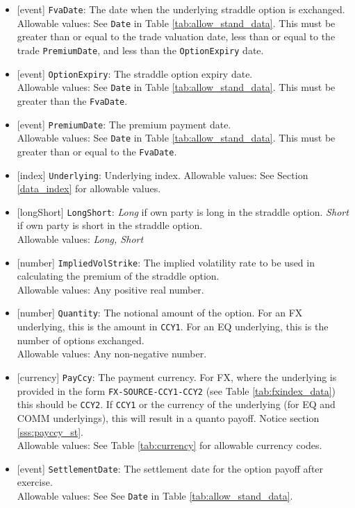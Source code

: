 \begin{itemize} 
  \item{}[event] \lstinline!FvaDate!: The date when the underlying straddle option is exchanged. \\
    Allowable values: See \lstinline!Date! in Table \ref{tab:allow_stand_data}.
    This must be greater than or equal to the trade valuation date, less than or equal
    to the trade \lstinline!PremiumDate!, and less than the \lstinline!OptionExpiry!
    date.
  \item{}[event] \lstinline!OptionExpiry!: The straddle option expiry date. \\
    Allowable values: See \lstinline!Date! in Table \ref{tab:allow_stand_data}.
    This must be greater than the \lstinline!FvaDate!.
  \item{}[event] \lstinline!PremiumDate!: The premium payment date. \\
    Allowable values: See \lstinline!Date! in Table \ref{tab:allow_stand_data}.
    This must be greater than or equal to the \lstinline!FvaDate!.
  \item{}[index] \lstinline!Underlying!: Underlying index.
    Allowable values: See Section \ref{data_index} for allowable values.
  \item{}[longShort] \lstinline!LongShort!: \emph{Long} if own party is long in the straddle option. \emph{Short} if own party is short in the straddle option.\\ 
    Allowable values: \emph{Long, Short} 
  \item{}[number] \lstinline!ImpliedVolStrike!: The implied volatility rate to be used in calculating the premium of the straddle option.\\
    Allowable values: Any positive real number.
  \item{}[number] \lstinline!Quantity!: The notional amount of the option. For an FX underlying, this is the amount in \lstinline!CCY1!.
  For an EQ underlying, this is the number of options exchanged.\\
    Allowable values: Any non-negative number.
  \item{}[currency] \lstinline!PayCcy!: The payment currency. For FX, where the underlying is provided
      in the form \lstinline!FX-SOURCE-CCY1-CCY2! (see Table \ref{tab:fxindex_data}) this should
      be \lstinline!CCY2!. If \lstinline!CCY1! or the currency of the underlying (for EQ and
      COMM underlyings), this will result in a quanto payoff. Notice section \ref{sss:payccy_st}. \\
        Allowable values: See Table \ref{tab:currency} for allowable currency codes.
  \item{}[event] \lstinline!SettlementDate!: The settlement date for the option payoff after exercise.\\ 
    Allowable values: See See \lstinline!Date! in Table \ref{tab:allow_stand_data}.
\end{itemize} 

